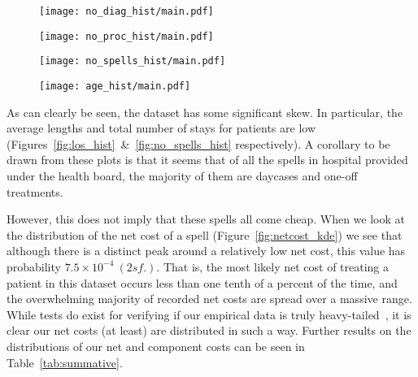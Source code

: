 \begin{figure}[h]
    \centering
    \begin{minipage}{.495\textwidth}
        \texttt{[image: no\_diag\_hist/main.pdf]}
        \label{fig:no_diag_hist}
    \end{minipage}\hfill%
    \begin{minipage}{.495\textwidth}
        \texttt{[image: no\_proc\_hist/main.pdf]}
        \label{fig:no_proc_hist}
    \end{minipage}
\end{figure}

\begin{figure}[h]
    \centering
    \begin{minipage}{.495\textwidth}
        \texttt{[image: no\_spells\_hist/main.pdf]}
        \label{fig:no_spells_hist}
    \end{minipage}\hfill%
    \begin{minipage}{.495\textwidth}
        \texttt{[image: age\_hist/main.pdf]}
        \label{fig:age_hist}
    \end{minipage}
\end{figure}

As can clearly be seen, the dataset has some significant skew. In particular,
the average lengths and total number of stays for patients are low
(Figures~\ref{fig:los_hist}~\&~\ref{fig:no_spells_hist} respectively). A
corollary to be drawn from these plots is that it seems that of all the spells
in hospital provided under the health board, the majority of them are daycases
and one-off treatments.

However, this does not imply that these spells all come cheap. When we look at
the distribution of the net cost of a spell (Figure~\ref{fig:netcost_kde}) we
see that although there is a distinct peak around a relatively low net cost,
this value has probability \(7.5\times10^{-4}\ (2 sf.)\). That is, the most
likely net cost of treating a patient in this dataset occurs less than one tenth
of a percent of the time, and the overwhelming majority of recorded net costs
are spread over a massive range. While tests do exist for verifying if our
empirical data is truly heavy-tailed~\cite{Bryson1974}, it is clear our net
costs (at least) are distributed in such a way. Further results on the
distributions of our net and component costs can be seen in
Table~\ref{tab:summative}.

